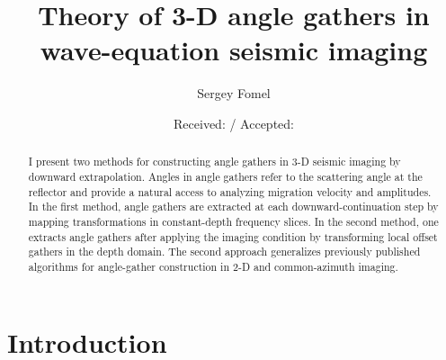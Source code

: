 \title{Theory of 3-D angle gathers in wave-equation seismic imaging}
\author{Sergey Fomel}



\date{Received:  / Accepted: }
                      
\maketitle

\begin{abstract}
  I present two methods for constructing angle gathers in 3-D seismic imaging
  by downward extrapolation. Angles in angle gathers refer to the scattering
  angle at the reflector and provide a natural access to analyzing migration
  velocity and amplitudes. In the first method, angle gathers are extracted at
  each downward-continuation step by mapping transformations in constant-depth
  frequency slices. In the second method, one extracts angle gathers after
  applying the imaging condition by transforming local offset gathers in the
  depth domain.  The second approach generalizes previously published
  algorithms for angle-gather construction in 2-D and common-azimuth imaging. 
\end{abstract}

\section{Introduction}

